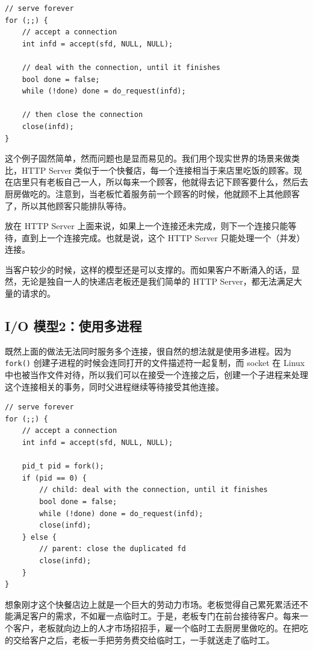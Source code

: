 \documentclass[a4paper]{article}
\begin{document}
\begin{verbatim}
// serve forever
for (;;) {
    // accept a connection
    int infd = accept(sfd, NULL, NULL);
    
    // deal with the connection, until it finishes
    bool done = false;
    while (!done) done = do_request(infd);
    
    // then close the connection
    close(infd);
}
\end{verbatim}

这个例子固然简单，然而问题也是显而易见的。我们用个现实世界的场景来做类比，HTTP Server 类似于一个快餐店，每一个连接相当于来店里吃饭的顾客。现在店里只有老板自己一人，所以每来一个顾客，他就得去记下顾客要什么，然后去厨房做吃的。注意到，当老板忙着服务前一个顾客的时候，他就顾不上其他顾客了，所以其他顾客只能排队等待。

放在 HTTP Server 上面来说，如果上一个连接还未完成，则下一个连接只能等待，直到上一个连接完成。也就是说，这个 HTTP Server 只能处理一个（并发）连接。

当客户较少的时候，这样的模型还是可以支撑的。而如果客户不断涌入的话，显然，无论是独自一人的快递店老板还是我们简单的 HTTP Server，都无法满足大量的请求的。

\subsection{I/O 模型2：使用多进程}

既然上面的做法无法同时服务多个连接，很自然的想法就是使用多进程。因为 \texttt{fork()} 创建子进程的时候会连同打开的文件描述符一起复制，而 socket 在 Linux 中也被当作文件对待，所以我们可以在接受一个连接之后，创建一个子进程来处理这个连接相关的事务，同时父进程继续等待接受其他连接。

\begin{verbatim}
// serve forever
for (;;) {
    // accept a connection
    int infd = accept(sfd, NULL, NULL);

    pid_t pid = fork();
    if (pid == 0) {
        // child: deal with the connection, until it finishes
        bool done = false;
        while (!done) done = do_request(infd);
        close(infd);
    } else {
        // parent: close the duplicated fd
        close(infd);
    }
}
\end{verbatim}

想象刚才这个快餐店边上就是一个巨大的劳动力市场。老板觉得自己累死累活还不能满足客户的需求，不如雇一点临时工。于是，老板专门在前台接待客户。每来一个客户，老板就向边上的人才市场招招手，雇一个临时工去厨房里做吃的。在把吃的交给客户之后，老板一手把劳务费交给临时工，一手就送走了临时工。
\end{document}
